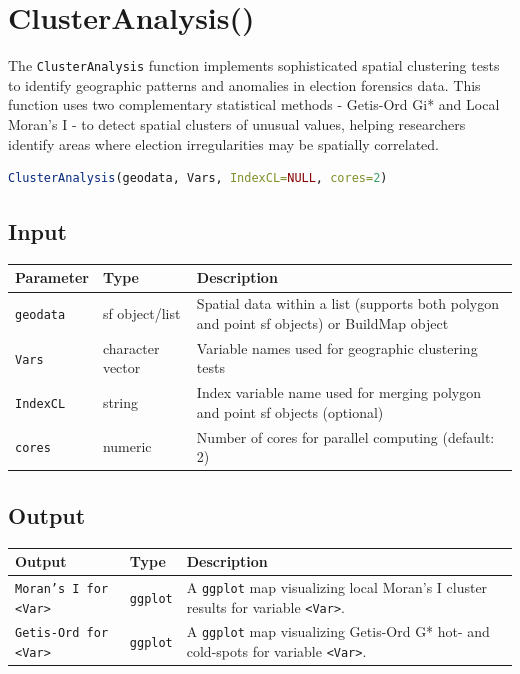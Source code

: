 \documentclass{article}
\begin{document}
\section{ClusterAnalysis()}

The \texttt{ClusterAnalysis} function implements sophisticated spatial clustering tests to identify geographic patterns and anomalies in election forensics data. This function uses two complementary statistical methods - Getis-Ord Gi* and Local Moran's I - to detect spatial clusters of unusual values, helping researchers identify areas where election irregularities may be spatially correlated.

\begin{lstlisting}[language=R]
ClusterAnalysis(geodata, Vars, IndexCL=NULL, cores=2)
\end{lstlisting}

\subsection{Input}
\begin{longtable}{p{3cm}p{3cm}p{8cm}}
\toprule
\textbf{Parameter} & \textbf{Type} & \textbf{Description} \\
\midrule
\texttt{geodata} & sf object/list & Spatial data within a list (supports both polygon and point sf objects) or BuildMap object \\
\texttt{Vars} & character vector & Variable names used for geographic clustering tests \\
\texttt{IndexCL} & string & Index variable name used for merging polygon and point sf objects (optional) \\
\texttt{cores} & numeric & Number of cores for parallel computing (default: 2) \\
\bottomrule
\end{longtable}

\subsection{Output}
\begin{longtable}{p{6cm}p{3cm}p{5cm}}
\toprule
\textbf{Output} & \textbf{Type} & \textbf{Description} \\
\midrule
\texttt{Moran's I for <Var>} & \texttt{ggplot} & A \texttt{ggplot} map visualizing local Moran's I cluster results for variable \texttt{<Var>}. \\
\texttt{Getis-Ord for <Var>} & \texttt{ggplot} & A \texttt{ggplot} map visualizing Getis-Ord G* hot- and cold-spots for variable \texttt{<Var>}. \\
\bottomrule
\end{longtable}
\end{document}
